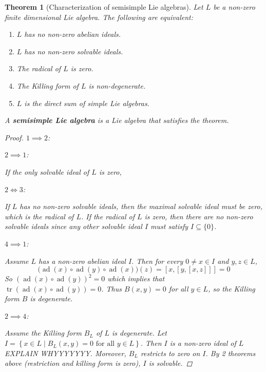 \documentclass[letterpaper, 10pt]{article}
\theoremstyle{theostyle}
\newtheorem{theorem}{Theorem}[section]
\newenvironment{thmstyle}[1][]{%
    \begin{theorem}[#1]\leavevmode\vspace{-\baselineskip}\myquote%
    }{\endmyquote\end{theorem}}
\begin{document}
\begin{thmstyle}[Characterization of semisimple Lie algebras]
    Let \(L\) be a non-zero finite dimensional Lie algebra.
    The following are equivalent:
    \begin{enumerate}
        \item \(L\) has no non-zero abelian ideals.
        \item \(L\) has no non-zero solvable ideals.
        \item The radical of \(L\) is zero.
        \item The Killing form of \(L\) is non-degenerate.
        \item \(L\) is the direct sum of simple Lie algebras.
    \end{enumerate}
    A \textbf{semisimple Lie algebra} is a Lie algebra that satisfies the theorem.

    \begin{proof}
        \(1 \implies 2\):

        \(2 \implies 1\):

        If the only solvable ideal of \(L\) is zero, 

        \(2 \iff 3\):

        If \(L\) has no non-zero solvable ideals, then the maximal solvable ideal must be zero, which is the radical of \(L\).
        If the radical of \(L\) is zero, then there are no non-zero solvable ideals since any other solvable ideal \(I\) must satisfy \(I \subseteq \{0\}\).

        \(4 \implies 1\):

        Assume \(L\) has a non-zero abelian ideal \(I\).
        Then for every \(0 \neq x \in I\) and \(y, z \in L\),
        \[\bigl(\operatorname{ad}{(x)} \circ \operatorname{ad}{(y)} \circ \operatorname{ad}{(x)}\bigr)(z) = [x,[y,[x,z]]] = 0\]
        So \(\left(\operatorname{ad}{(x)} \circ \operatorname{ad}{(y)}\right)^2 = 0\) which implies that
        \(\operatorname{tr}{\left(\operatorname{ad}{(x)} \circ \operatorname{ad}{(y)}\right)} = 0\).
        Thus \(B(x,y) = 0\) for all \(y \in L\), so the Killing form \(B\) is degenerate.

        \(2 \implies 4\):
        
        Assume the Killing form \(B_L\) of \(L\) is degenerate.
        Let \(I = \left\{x \in L \mid B_L(x,y) = 0 \text{ for all } y \in L\right\}\).
        Then \(I\) is a non-zero ideal of \(L\) EXPLAIN WHYYYYYYY.
        Moreover, \(B_L\) restricts to zero on \(I\).
        By 2 theorems above (restriction and killing form is zero), \(I\) is solvable.


    \end{proof}
\end{thmstyle}
\end{document}
